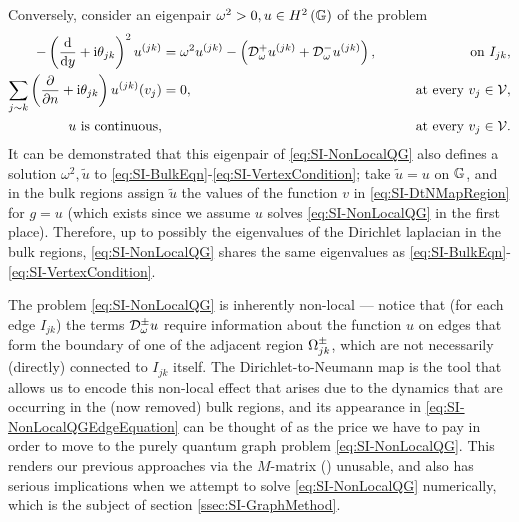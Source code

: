 Conversely, consider an eigenpair $\omega^2>0, u\in H^2\left( \mathbb{G} \right)$ of the problem
\begin{subequations} \label{eq:SI-NonLocalQG}
	\begin{align}
		- \left( \dfrac{\mathrm{d}}{\mathrm{d}y} + \mathrm{i}\theta_{jk} \right)^2u^{(jk)} 
		&= \omega^2 u^{(jk)} - \left(  \mathcal{D}^+_\omega u^{(jk)} + \mathcal{D}^-_\omega u^{(jk)} \right),
		&\qquad\text{on } I_{jk}, \label{eq:SI-NonLocalQGEdgeEquation}  \\
		\sum_{j\sim k} \left( \dfrac{\partial }{\partial n}+\mathrm{i}\theta_{jk} \right) u^{(jk)}(v_j) &= 0,
		&\qquad\text{at every } v_j\in\mathcal{V}, \label{eq:SI-NonLocalQGVertexDeriv} \\
		u \text{ is continuous,} & 
		&\qquad\text{at every } v_j\in\mathcal{V}. \label{eq:SI-NonLocalQGVertexCont}
	\end{align}
\end{subequations}
It can be demonstrated that this eigenpair of \eqref{eq:SI-NonLocalQG} also defines a solution $\omega^2, \tilde{u}$ to \eqref{eq:SI-BulkEqn}-\eqref{eq:SI-VertexCondition}; take $\tilde{u}=u$ on $\mathbb{G}$, and in the bulk regions assign $\tilde{u}$ the values of the function $v$ in \eqref{eq:SI-DtNMapRegion} for $g=u$ (which exists since we assume $u$ solves \eqref{eq:SI-NonLocalQG} in the first place).
Therefore, up to possibly the eigenvalues of the Dirichlet laplacian in the bulk regions, \eqref{eq:SI-NonLocalQG} shares the same eigenvalues as \eqref{eq:SI-BulkEqn}-\eqref{eq:SI-VertexCondition}.

The problem \eqref{eq:SI-NonLocalQG} is inherently non-local --- notice that (for each edge $I_{jk}$) the terms $\mathcal{D}^{\pm}_\omega u$ require information about the function $u$ on edges that form the boundary of one of the adjacent region $\Omega_{jk}^{\pm}$, which are not necessarily (directly) connected to $I_{jk}$ itself.
The Dirichlet-to-Neumann map is the tool that allows us to encode this non-local effect that arises due to the dynamics that are occurring in the (now removed) bulk regions, and its appearance in \eqref{eq:SI-NonLocalQGEdgeEquation} can be thought of as the price we have to pay in order to move to the purely quantum graph problem \eqref{eq:SI-NonLocalQG}.
This renders our previous approaches via the $M$-matrix () unusable, and also has serious implications when we attempt to solve \eqref{eq:SI-NonLocalQG} numerically, which is the subject of section \ref{ssec:SI-GraphMethod}.

